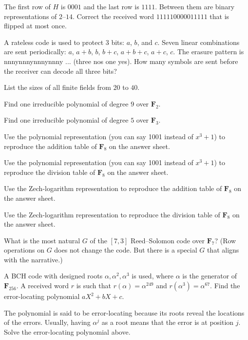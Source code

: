 \documentclass[a4paper]{article}
\def\FF{\mathbf F}
\begin{document}
\Problem{6em}
The first row of $H$ is $0001$ and the last row is $1111$.
Between them are binary representations of $2$--$14$.
Correct the received word $111110000011111$ that is flipped at most once.

\Problem{3em}
A rateless code is used to protect $3$ bits: $a$, $b$, and $c$.
Seven linear combinations are sent periodically:
$a$, $a + b$, $b$, $b + c$, $a + b + c$, $a + c$, $c$.
The erasure pattern is nnnynnnynnnynnny ... (three nos one yes).
How many symbols are sent before the receiver can decode all three bits?


\Problem{10em}
List the sizes of all finite fields from $20$ to $40$.

\Problem{6em}
Find one irreducible polynomial of degree $9$ over $\FF_2$.

\Problem{6em}
Find one irreducible polynomial of degree $5$ over $\FF_3$.

\Problem{10em}
Use the polynomial representation (you can say 1001 instead of $x^3 + 1$)
to reproduce the addition table of $\FF_8$ on the answer sheet.

\Problem{10em}
Use the polynomial representation (you can say 1001 instead of $x^3 + 1$)
to reproduce the division table of $\FF_8$ on the answer sheet.

\Problem{10em}
Use the Zech-logarithm representation
to reproduce the addition table of $\FF_8$ on the answer sheet.

\Problem{10em}
Use the Zech-logarithm representation
to reproduce the division table of $\FF_8$ on the answer sheet.

\Problem{10em}
What is the most natural $G$ of the $[7, 3]$ Reed--Solomon code over $\FF_7$?
(Row operations on $G$ does not change the code.
But there is a special $G$ that aligns with the narrative.)

\Problem{4em}
A BCH code with designed roots $\alpha, \alpha^2, \alpha^3$ is used,
where $\alpha$ is the generator of $\FF_{256}$.
A received word $r$ is such that
$r(\alpha) = \alpha^{249}$ and $r(\alpha^3) = \alpha^{67}$.
Find the error-locating polynomial $aX^2 + bX + c$.

\Problem{4em}
The polynomial is said to be error-locating
because its roots reveal the locations of the errors.
Usually, having $\alpha^j$ as a root means that the error is at position $j$.
Solve the error-locating polynomial above.
\end{document}
